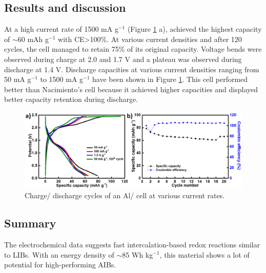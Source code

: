 \subsection{Results and discussion}
At a high current rate of 1500 mA g$^{-1}$ (Figure \ref{Figures/chap6fig:MoO3cdcce} a),  achieved the highest capacity of $\sim$60 mAh g$^{-1}$ with CE>100\%. At various current densities and after 120 cycles, the cell managed to retain 75\% of its original capacity. Voltage bends were observed during charge at 2.0 and 1.7 V and a plateau was observed during discharge at 1.4 V. Discharge capacities at various current densities ranging from 50 mA g$^{-1}$ to 1500 mA g$^{-1}$ have been shown in Figure \ref{Figures/chap6fig:MoO3cdcce}. This cell performed better than Nacimiento's cell because it achieved higher capacities and displayed better capacity retention during discharge.  

\begin{figure}[th!]
\centering
\includegraphics[width=\textwidth]{Figures/chap6fig/MoO3cdcce}
\caption{Charge/ discharge cycles of an Al/ cell at various current rates.}
\label{Figures/chap6fig:MoO3cdcce}
\end{figure}

\subsection{Summary}
The electrochemical data suggests fast intercalation-based redox reactions similar to LIBs. With an energy density of $\sim$85 Wh kg$^{-1}$, this material shows a lot of potential for high-performing AIBs. 



